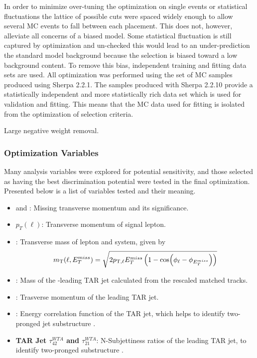 In order to minimize over-tuning the optimization on single events or statistical fluctuations the lattice of possible cuts were spaced widely enough to allow several MC events to fall between each placement. This does not, however, alleviate all concerns of a biased model. Some statistical fluctuation is still captured by optimization and un-checked this would lead to an under-prediction the standard model background because the selection is biased toward a low background content. To remove this bias, independent training and fitting data sets are used. All optimization was performed using the set of MC samples produced using Sherpa 2.2.1. The samples produced with Sherpa 2.2.10 provide a statistically independent and more statistically rich data set which is used for validation and fitting. This means that the MC data used for fitting is isolated from the optimization of selection criteria.

Large negative weight removal.

\subsubsection{Optimization Variables}
Many analysis variables were explored for potential sensitivity, and those selected as having the best discrimination potential were tested in the final optimization. Presented below is a list of variables tested and their meaning.

\begin{itemize}
  \item \textbf{\met} and \metsig: Missing transverse momentum and its significance.
  \item \textbf{$p_T(\ell)$}: Transverse momentum of signal lepton.
  \item \textbf{\mtlepmet}: Transverse mass of lepton and \met system, given by
  \begin{equation}
  m_{\text{T}}(\ell, E_{T}^{miss}) = \sqrt{2 p_{\text{T},\ell} E_{T}^{miss} \left( 1 - \cos(\phi_\ell - \phi_{E_{T}^{miss}}) \right) }
  \end{equation}
  \item \textbf{\mTAR}: Mass of the \pT-leading TAR jet calculated from the rescaled matched tracks.
  \item \textbf{\ptTAR}: Trasverse momentum of the leading TAR jet.
  \item \textbf{\DtwoTAR}: Energy correlation function of the TAR jet, which helps to identify two-pronged jet substructure \cite{DTwo}.
  \item \textbf{TAR Jet $\tau_{42}^{WTA}$ and $\tau_{21}^{WTA}$}: N-Subjettiness ratios of the leading TAR jet, to identify two-pronged substructure \cite{Tau42}.
\end{itemize}

